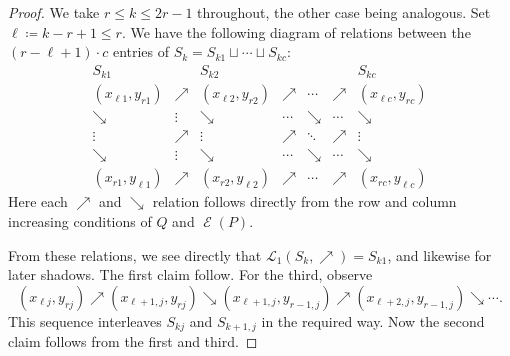 \documentclass[10pt,a4paper]{amsart}
\DeclareMathOperator{\evacuation}{\mathcal{E}}
\begin{document}
\begin{proof}
    We take $r \leq k \leq 2r-1$ throughout, the other case being analogous. Set $\ell \coloneq k-r+1 \leq r$. We have the following diagram of relations between the $(r-\ell+1) \cdot c$ entries of $S_k = S_{k1} \sqcup \cdots \sqcup S_{kc}$:
    \[
    \begin{array}{ccccccc}
        S_{k1}
          &
          &
          S_{k2}
          &
          &
          &
          & S_{kc} \\
        \hline
        (x_{\ell1},y_{r1})
          & \nearrow
          & (x_{\ell2},y_{r2})
          & \nearrow
          & \cdots
          & \nearrow
          & (x_{\ell c},y_{rc}) \\
        \searrow
          & \vdots
          & \searrow
          & \cdots
          & \searrow
          & \cdots
          & \searrow \\
        \vdots
          & \nearrow
          & \vdots
          & \nearrow
          & \ddots
          & \nearrow
          & \vdots\\
        \searrow
          & \vdots
          & \searrow
          & \cdots
          & \searrow
          & \cdots
          & \searrow \\
        (x_{r1},y_{\ell 1})
          & \nearrow
          & (x_{r2},y_{\ell 2})
          & \nearrow
          & \cdots
          & \nearrow
          & (x_{rc},y_{\ell c})
    \end{array}
    \]
    Here each $\nearrow$ and $\searrow$ relation follows directly from the row and column increasing conditions of $Q$ and $\evacuation(P)$.

    From these relations, we see directly that $\mathcal{L}_1(S_k, \nearrow) = S_{k1}$, and likewise for later shadows. The first claim follow. For the third, observe
      \[ (x_{\ell j}, y_{r j})
         \nearrow (x_{\ell+1,j}, y_{rj})
         \searrow (x_{\ell+1,j}, y_{r-1,j})
         \nearrow (x_{\ell+2,j}, y_{r-1,j})
         \searrow \cdots. \]
    This sequence interleaves $S_{kj}$ and $S_{k+1,j}$ in the required way. Now the second claim follows from the first and third.
\end{proof}
\end{document}
